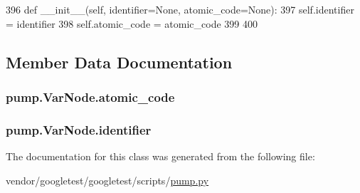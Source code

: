 \begin{DoxyCode}
396   \textcolor{keyword}{def }\_\_init\_\_(self, identifier=None, atomic\_code=None):
397     self.identifier = identifier
398     self.atomic\_code = atomic\_code
399 
400 
\end{DoxyCode}


\subsection{Member Data Documentation}
\subsubsection[{\texorpdfstring{atomic\+\_\+code}{atomic_code}}]{\setlength{\rightskip}{0pt plus 5cm}pump.\+Var\+Node.\+atomic\+\_\+code}\hypertarget{classpump_1_1VarNode_ad6bef6a8577b994fbe9ccddf3c82d2fc}{}\label{classpump_1_1VarNode_ad6bef6a8577b994fbe9ccddf3c82d2fc}
\subsubsection[{\texorpdfstring{identifier}{identifier}}]{\setlength{\rightskip}{0pt plus 5cm}pump.\+Var\+Node.\+identifier}\hypertarget{classpump_1_1VarNode_aa2b634e2443646c3754f2d193efa4dc7}{}\label{classpump_1_1VarNode_aa2b634e2443646c3754f2d193efa4dc7}


The documentation for this class was generated from the following file\+:\begin{DoxyCompactItemize}
\item 
vendor/googletest/googletest/scripts/\hyperlink{pump_8py}{pump.\+py}\end{DoxyCompactItemize}
